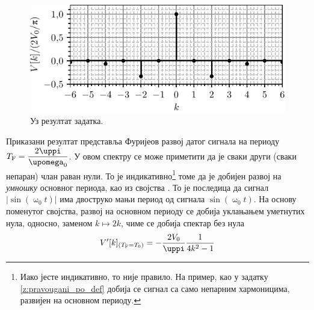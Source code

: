 \begin{figure}
    \centering 
    \includegraphics{fig/abs_sin_Vk.pdf}
    \caption{Уз резултат задатка.}
    \label{fig:\ID.abssinVk}
\end{figure}
Приказани резултат представља Фуријеов развој датог сигнала 
на периоду $T_{\rm F} = \dfrac{2\uppi}{\upomega_0}$. 
У овом спектру се може приметити да је сваки други (сваки непаран) члан раван нули. 
То је индикативно\footnote{Иако јесте индикативно, то није правило. На пример, као у задатку 
\ref{z:pravougani_po_def} добија се сигнал са само непарним хармоницима, развијен на основном периоду.} 
томе да је добијен развој на \textit{умношку} основног периода, као 
из својства . 
То је последица да сигнал $|\sin(\upomega_0 t)|$ има двоструко мањи период од сигнала 
$\sin(\upomega_0 t)$. На основу поменутог својства, развој на основном периоду се добија уклањањем 
уметнутих нула, односно, заменом $k \mapsto 2k$, чиме се добија спектар без нула 
\begin{equation}
    V'[k]_{(T_{\rm F} = T_0)}
    = 
    -\dfrac{2V_0}{\uppi} \dfrac{1}{4k^2 - 1}
\end{equation}
